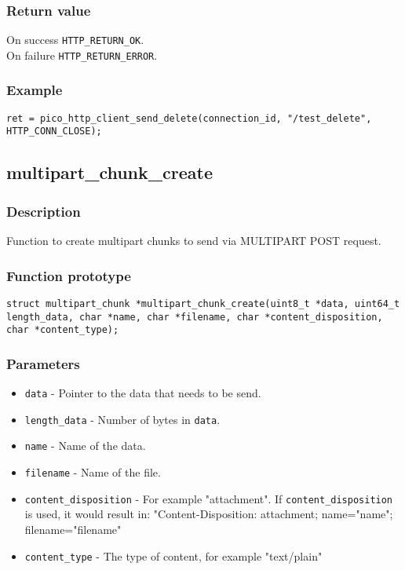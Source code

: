 \subsubsection*{Return value}
On success \texttt{HTTP\_RETURN\_OK}.
\\On failure \texttt{HTTP\_RETURN\_ERROR}.
\subsubsection*{Example}
\begin{verbatim}
ret = pico_http_client_send_delete(connection_id, "/test_delete", HTTP_CONN_CLOSE);
\end{verbatim}


\subsection{multipart\_chunk\_create}

\subsubsection*{Description}
Function to create multipart chunks to send via MULTIPART POST request. 

\subsubsection*{Function prototype}
\texttt{struct multipart\_chunk *multipart\_chunk\_create(uint8\_t *data, uint64\_t length\_data, char *name, char *filename, char *content\_disposition, char *content\_type);}

\subsubsection*{Parameters}
\begin{itemize}[noitemsep]
\item \texttt{data} - Pointer to the data that needs to be send.
\item \texttt{length\_data} - Number of bytes in \texttt{data}.
\item \texttt{name} - Name of the data.
\item \texttt{filename} - Name of the file.
\item \texttt{content\_disposition} - For example "attachment". If \texttt{content\_disposition} is used, it would result in: "Content-Disposition: attachment; name="name"; filename="filename"
\item \texttt{content\_type} - The type of content, for example "text/plain"
\end{itemize}
